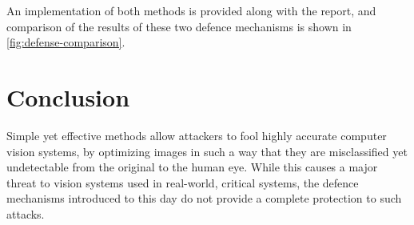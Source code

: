 \documentclass[twocolumn]{../cs-classes/cs-classes}
\begin{document}
An implementation of both methods is provided along with the report, and comparison of the results of these two defence mechanisms is shown in \autoref{fig:defense-comparison}.

\section{Conclusion}
Simple yet effective methods allow attackers to fool highly accurate computer vision systems, by optimizing images in such a way that they are misclassified yet undetectable from the original to the human eye. While this causes a major threat to vision systems used in real-world, critical systems, the defence mechanisms introduced to this day do not provide a complete protection to such attacks.

\nocite{*}
\printbibliography
\end{document}

